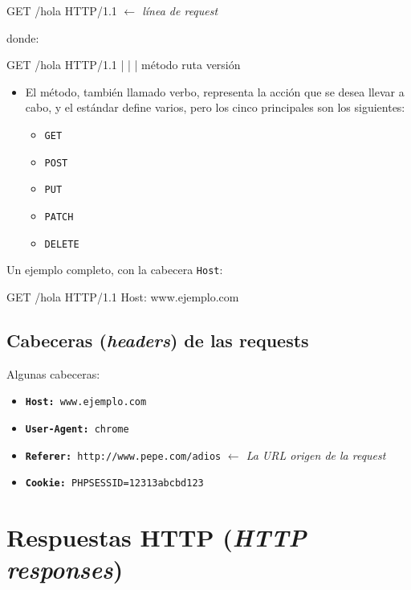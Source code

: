 \documentclass[a4paper,11pt]{memoir}
\begin{document}
\begin{codigo}
GET /hola HTTP/1.1          \emph{\(\leftarrow\) línea de request}
\end{codigo}

donde:

\begin{codigo}
GET     /hola   HTTP/1.1
|       |       |
método  ruta    versión
\end{codigo}

\begin{itemize}
    \item El método, también llamado verbo, representa la acción que se desea
    llevar a cabo, y el estándar define varios, pero los cinco principales
    son los siguientes:

    \begin{itemize}
        \item \texttt{GET}
        \item \texttt{POST}
        \item \texttt{PUT}
        \item \texttt{PATCH}
        \item \texttt{DELETE}
    \end{itemize}
\end{itemize}

Un ejemplo completo, con la cabecera \texttt{Host}:
\begin{listado}
GET /hola HTTP/1.1
Host: www.ejemplo.com
\end{listado}

\subsection{Cabeceras (\emph{headers}) de las requests}

Algunas cabeceras:
\begin{itemize}
    \item \texttt{\textbf{Host:}}\texttt{ www.ejemplo.com}
    \item \texttt{\textbf{User-Agent:}}\texttt{ chrome}
    \item \texttt{\textbf{Referer:}}\texttt{ http://www.pepe.com/adios} \emph{$\leftarrow$
        La URL origen de la request}
    \item \texttt{\textbf{Cookie:}}\texttt{ PHPSESSID=12313abcbd123}
\end{itemize}

\section{Respuestas HTTP (\emph{HTTP responses})}
\end{document}
